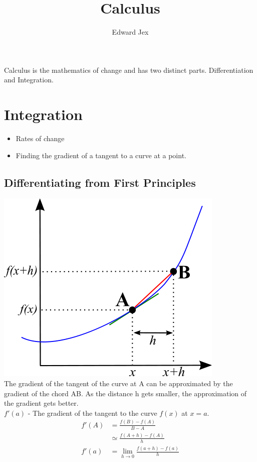 \documentclass[a4paper,12pt]{article}
\begin{document}
\title{Calculus}	
\author{Edward Jex}
\maketitle
Calculus is the mathematics of change and has two distinct parts. Differentiation and Integration. 
\section*{Integration}
\begin{itemize}
	\item Rates of change
	\item Finding the gradient of a tangent to a curve at a point. 
\end{itemize}
\subsection*{Differentiating from First Principles}
\includegraphics[scale=0.5]{Graph1}\\
The gradient of the tangent of the curve at A can be approximated by the gradient of the chord AB. As the distance h gets smaller, the approximation of the gradient gets better.  \\
$f'(a)$ - The gradient of the tangent to the curve $f(x)$ at $x=a$. \\
\begin{align*}
f'(A) & = \frac{f(B) - f(A)}{B - A} \\
& \simeq \frac{f(A+h) - f(A)}{h} \\
f'(a) & = \lim_{h \to 0} \frac{f(a+h) - f(a)}{h} \\
\end{align*}
\end{document}
